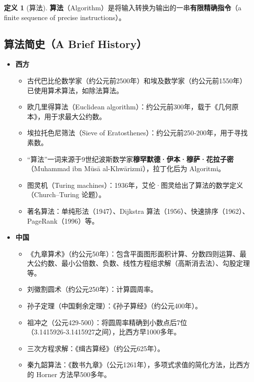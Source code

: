 \documentclass[UTF8,11pt,a4paper]{ctexbook}   %
\theoremstyle{definition}
\newtheorem{definition}{定义}[section]
\begin{document}
\begin{definition}[算法]
\textbf{算法}（Algorithm）是将输入转换为输出的一串\textbf{有限精确指令}（a finite sequence of precise instructions）。
\end{definition}

\subsection{算法简史（A Brief History）}

\begin{itemize}[leftmargin=2em]
    \item \textbf{西方}
    \begin{itemize}
        \item 古代巴比伦数学家（约公元前2500年）和埃及数学家（约公元前1550年）已使用算术算法，如除法算法。
        \item 欧几里得算法（Euclidean algorithm）：约公元前300年，载于《几何原本》，用于求最大公约数。
        \item 埃拉托色尼筛法（Sieve of Eratosthenes）：约公元前250‑200年，用于寻找素数。
        \item “算法”一词来源于9世纪波斯数学家\textbf{穆罕默德·伊本·穆萨·花拉子密}（Muhammad ibn Mūsā al-Khwārizmī），拉丁化后为 Algoritmi。
        \item 图灵机（Turing machines）：1936年，艾伦·图灵给出了算法的数学定义（Church–Turing 论题）。
        \item 著名算法：单纯形法（1947）、Dijkstra 算法（1956）、快速排序（1962）、PageRank（1996）等。
    \end{itemize}
    \item \textbf{中国}
    \begin{itemize}
        \item 《九章算术》（约公元50年）：包含平面图形面积计算、分数四则运算、最大公约数、最小公倍数、负数、线性方程组求解（高斯消去法）、勾股定理等。
        \item 刘徽割圆术（约公元250年）：计算圆周率。
        \item 孙子定理（中国剩余定理）：《孙子算经》（约公元400年）。
        \item 祖冲之（公元429‑500）：将圆周率精确到小数点后7位（3.1415926‑3.1415927之间），比西方早1000多年。
        \item 三次方程求解：《缉古算经》（约公元625年）。
        \item 秦九韶算法：《数书九章》（公元1261年），多项式求值的简化方法，比西方的 Horner 方法早500多年。
    \end{itemize}
\end{itemize}
\end{document}
